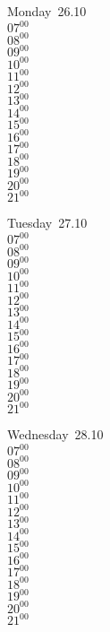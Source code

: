 \documentclass[11pt,a4paper]{book}\usepackage[]{graphicx}\usepackage[]{color}
\begin{document}
\begin{headerbox}
\end{headerbox}
\begin{weekdaybox}
  Monday~26.10\\
  { 
  \vfill
  $07^{00}$\\
$08^{00}$\\
$09^{00}$\\
$10^{00}$\\
$11^{00}$\\
$12^{00}$\\
$13^{00}$\\
$14^{00}$\\
$15^{00}$\\
$16^{00}$\\
$17^{00}$\\
$18^{00}$\\
$19^{00}$\\
$20^{00}$\\
$21^{00}$\\
  }
\end{weekdaybox}
\begin{weekdaybox}
  Tuesday~27.10\\
  { 
  \vfill
  $07^{00}$\\
$08^{00}$\\
$09^{00}$\\
$10^{00}$\\
$11^{00}$\\
$12^{00}$\\
$13^{00}$\\
$14^{00}$\\
$15^{00}$\\
$16^{00}$\\
$17^{00}$\\
$18^{00}$\\
$19^{00}$\\
$20^{00}$\\
$21^{00}$\\
  }
\end{weekdaybox}
\begin{weekdaybox}
  Wednesday~28.10\\
  { 
  \vfill
  $07^{00}$\\
$08^{00}$\\
$09^{00}$\\
$10^{00}$\\
$11^{00}$\\
$12^{00}$\\
$13^{00}$\\
$14^{00}$\\
$15^{00}$\\
$16^{00}$\\
$17^{00}$\\
$18^{00}$\\
$19^{00}$\\
$20^{00}$\\
$21^{00}$\\
  }
\end{weekdaybox}
\end{document}
